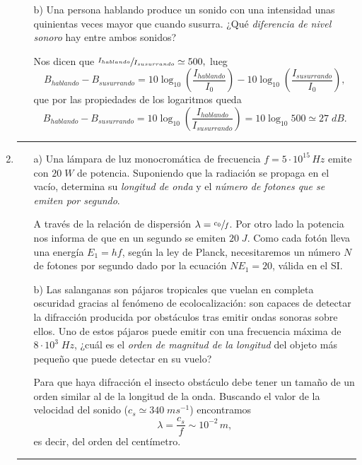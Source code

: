 \documentclass[a4paper,14pt]{exam}
\newcommand{\halmos}{\vspace*{-7mm}
	
					\begin{flushright}
						\rule{1mm}{2.5mm} 
					\end{flushright}\vspace*{-6mm}
						
					  }
\renewcommand{\qed}{\halmos}
\begin{document}
\begin{enumerate}
\begin{itemize}
\begin{mdframed}[backgroundcolor=yellow!20]
\end{mdframed}
				\item[b)] Una persona hablando produce un sonido con una intensidad unas quinientas veces mayor que 						cuando susurra. ¿Qué \textit{diferencia de nivel sonoro} hay entre ambos sonidos?
				\vspace*{.2mm}			
		\begin{mdframed}[backgroundcolor=yellow!20]  
	Nos dicen que $\sfrac{I_{hablando}}{I_{susurrando}}\simeq 500,$ lueg
	\[B_{hablando}-B_{susurrando}=10\log_{10}\left(\frac{I_{hablando}}{I_0}\right)-10\log_{10}\left(\frac{I_{susurrando}}{I_0}\right),\]
	que por las propiedades de los logaritmos queda
	\[B_{hablando}-B_{susurrando}=10\log_{10}\left(\frac{I_{hablando}}{I_{susurrando}}\right)=10\log_{10}500\simeq 27\;dB.\]
\end{mdframed}						
			\end{itemize}
		\qed
		
\newpage
		
		\item 	
			\begin{itemize}
				\item[a)] Una lámpara de luz monocromática de frecuencia $f=5\cdot 10^{15}\,Hz$ emite con $20\;W$ de potencia.  Suponiendo que la radiación se propaga en el vacío, determina su \textit{longitud de onda} y el \textit{número de fotones que se emiten por segundo}.
				\begin{mdframed}[backgroundcolor=yellow!20]  
				A través de la relación de dispersión $\lambda=\sfrac{c_0}{f}$. Por otro lado la potencia nos informa de que en un segundo se emiten $20\;J$. Como cada fotón lleva una energía $E_1=hf$, según la ley de Planck, necesitaremos un número $N$ de fotones por segundo dado por la ecuación $NE_1=20$, válida en el {\small SI}.
				\end{mdframed}
				\item[b)] Las salanganas %
			son pájaros tropicales que vuelan en completa oscuridad gracias al fenómeno de ecolocalización: son capaces de detectar la difracción producida por obstáculos tras emitir ondas sonoras sobre ellos. Uno de estos pájaros puede emitir con una frecuencia máxima de $8\cdot 10^3\; Hz$, ¿cuál es el \textit{orden de magnitud de la longitud} del objeto más pequeño que puede detectar en su vuelo?
			\begin{mdframed}[backgroundcolor=yellow!20]  
			Para que haya difracción el insecto obstáculo debe tener un tamaño de un orden similar al de la longitud de la onda. Buscando el valor de la velocidad del sonido ($c_s\simeq 340\;ms^{-1}$) encontramos
			\[\lambda=\frac{c_s}{f}\sim 10^{-2}\,m,\]
			es decir, del orden del centímetro.
			\end{mdframed}
			\end{itemize}
		\qed


\end{enumerate}
\end{document}
